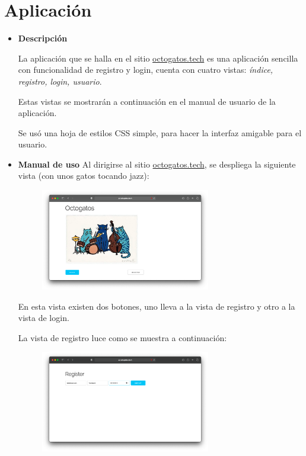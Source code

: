 \documentclass{article}
\begin{document}
\begin{enumerate}
\begin{itemize}
    \end{itemize}

    \section{Aplicación}

    \begin{itemize}
        \item {\bf Descripción}

        La aplicación que se halla en el sitio \url{octogatos.tech} es una
        aplicación sencilla con funcionalidad de registro y login, cuenta con
        cuatro vistas: {\it índice, registro, login, usuario}.

        Estas vistas se mostrarán a continuación en el manual de usuario de la
        aplicación.

        Se usó una hoja de estilos CSS simple, para hacer la interfaz amigable
        para el usuario.

        \item {\bf Manual de uso}
        Al dirigirse al sitio \url{octogatos.tech}, se despliega la siguiente
        vista (con unos gatos tocando jazz):

        \begin{figure}[H]
            \centering
            \includegraphics[width=0.70\textwidth]{AppServer/z1}
        \end{figure}

        En esta vista existen dos botones, uno lleva a la vista de registro y
        otro a la vista de login.

        La vista de registro luce como se muestra a continuación:

        \begin{figure}[H]
            \centering
            \includegraphics[width=0.70\textwidth]{AppServer/z2}
        \end{figure}


\end{itemize}
\end{enumerate}
\end{document}
